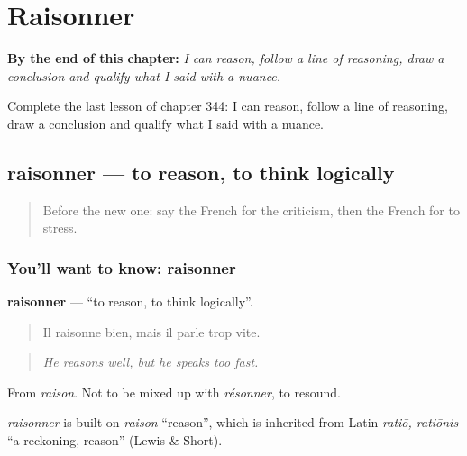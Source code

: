 
\chapter{Raisonner}
\label{ch:fr-raisonner}

\begin{chapteropening}
\textbf{By the end of this chapter:} \emph{I can reason, follow a line of reasoning, draw a conclusion and qualify what I said with a nuance.}

Complete the last lesson of chapter 344: I can reason, follow a line of reasoning, draw a conclusion and qualify what I said with a nuance.
\end{chapteropening}

\section[raisonner]{raisonner — to reason, to think logically}

\label{lesson:FR-C344-raisonner}



\begin{quote}
Before the new one: say the French for the criticism, then the French for to stress.
\end{quote}

\subsection*{You'll want to know: raisonner}
\textbf{raisonner} — \textquotedblleft{}to reason, to think logically\textquotedblright{}.

\begin{quote}
Il raisonne bien, mais il parle trop vite.
\end{quote}

\begin{quote}
\emph{He reasons well, but he speaks too fast.}
\end{quote}

From \emph{raison}. Not to be mixed up with \emph{résonner}, to resound.

\begin{cousinweb}
\emph{raisonner} is built on \emph{raison} \textquotedblleft{}reason\textquotedblright{}, which is inherited from Latin \emph{ratiō, ratiōnis} \textquotedblleft{}a reckoning, reason\textquotedblright{} (Lewis \& Short).
\end{cousinweb}

